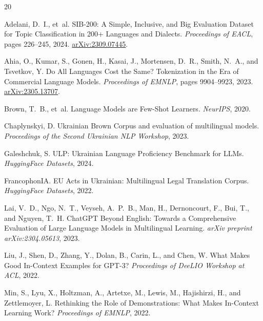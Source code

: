 \documentclass[11pt,a4paper]{article}
\begin{document}
\begin{thebibliography}{20}
\providecommand{\natexlab}[1]{#1}

Adelani, D.~I., et~al.
\newblock SIB-200: A Simple, Inclusive, and Big Evaluation Dataset for Topic Classification in 200+ Languages and Dialects.
\newblock \emph{Proceedings of EACL}, pages 226--245, 2024.
\newblock \href{https://arxiv.org/abs/2309.07445}{arXiv:2309.07445}.

Ahia, O., Kumar, S., Gonen, H., Kasai, J., Mortensen, D.~R., Smith, N.~A., and Tsvetkov, Y.
\newblock Do All Languages Cost the Same? Tokenization in the Era of Commercial Language Models.
\newblock \emph{Proceedings of EMNLP}, pages 9904--9923, 2023.
\newblock \href{https://arxiv.org/abs/2305.13707}{arXiv:2305.13707}.

Brown, T.~B., et~al.
\newblock Language Models are Few-Shot Learners.
\newblock \emph{NeurIPS}, 2020.

Chaplynskyi, D.
\newblock Ukrainian Brown Corpus and evaluation of multilingual models.
\newblock \emph{Proceedings of the Second Ukrainian NLP Workshop}, 2023.

Galeshchuk, S.
\newblock ULP: Ukrainian Language Proficiency Benchmark for LLMs.
\newblock \emph{HuggingFace Datasets}, 2024.

FrancophonIA.
\newblock EU Acts in Ukrainian: Multilingual Legal Translation Corpus.
\newblock \emph{HuggingFace Datasets}, 2022.

Lai, V.~D., Ngo, N.~T., Veyseh, A.~P.~B., Man, H., Dernoncourt, F., Bui, T., and Nguyen, T.~H.
\newblock ChatGPT Beyond English: Towards a Comprehensive Evaluation of Large Language Models in Multilingual Learning.
\newblock \emph{arXiv preprint arXiv:2304.05613}, 2023.

Liu, J., Shen, D., Zhang, Y., Dolan, B., Carin, L., and Chen, W.
\newblock What Makes Good In-Context Examples for GPT-3?
\newblock \emph{Proceedings of DeeLIO Workshop at ACL}, 2022.

Min, S., Lyu, X., Holtzman, A., Artetxe, M., Lewis, M., Hajishirzi, H., and Zettlemoyer, L.
\newblock Rethinking the Role of Demonstrations: What Makes In-Context Learning Work?
\newblock \emph{Proceedings of EMNLP}, 2022.


\end{thebibliography}
\end{document}
